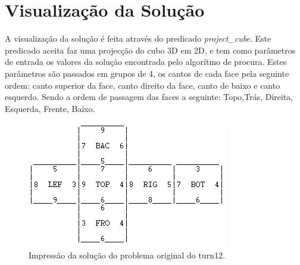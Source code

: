 \section{Visualização da Solução}
\label{rest:5}

A visualização da solução é feita através do predicado \textit{project\_cube}.
Este predicado aceita faz uma projecção do cubo 3D em 2D, e tem como parâmetros de entrada os valores da solução encontrada pelo algorítmo de procura. Estes parâmetros são passados em grupos de 4, os cantos de cada face pela seguinte ordem: canto superior da face, canto direito da face, canto de baixo e canto esquerdo. Sendo a ordem de passagem das faces a seguinte: Topo,Trás, Direita, Esquerda, Frente, Baixo.

\begin{figure}[h!]
\begin{center}
\includegraphics[scale=0.8]{resol.png}
\caption{Impressão da solução do problema original do turn12.}
\label{fig:1}
\end{center}
\end{figure}


%
